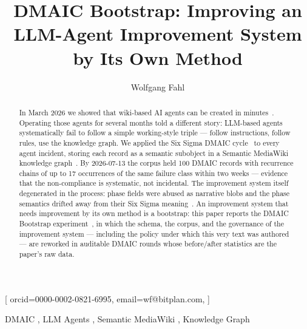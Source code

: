 \documentclass[
]{ceurart}
\begin{document}


\title{DMAIC Bootstrap: Improving an LLM-Agent Improvement System by Its Own Method}

\author[1]{Wolfgang Fahl}[%
orcid=0000-0002-0821-6995,
email=wf@bitplan.com,
]
\cormark[1]
\address[1]{BITPlan GmbH, Willich, Germany}


\begin{abstract}
In March 2026 we showed that wiki-based AI agents can be created in
minutes~\cite{fahl2026sixagents}. Operating those agents for several months
told a different story: LLM-based agents systematically fail to follow a
simple working-style triple --- follow instructions, follow rules, use the
knowledge graph. We applied the Six Sigma DMAIC
cycle~\cite{demast2012dmaic} to every agent incident, storing each record
as a semantic subobject in a Semantic MediaWiki~\cite{kroetzsch2006smw}
knowledge graph~\cite{agentteamcontext}. By 2026-07-13 the corpus held 100
DMAIC records with recurrence chains of up to 17 occurrences of the same
failure class within two weeks --- evidence that the non-compliance is
systematic, not incidental. The improvement system itself degenerated in
the process: phase fields were abused as narrative blobs and the phase
semantics drifted away from their Six Sigma
meaning~\cite{deming1986,demast2012dmaic}. An improvement system that needs
improvement by its own method is a bootstrap: this paper reports the DMAIC
Bootstrap experiment~\cite{dmaicbootstrap}, in which the schema, the
corpus, and the governance of the improvement system --- including the
policy under which this very text was authored --- are reworked in
auditable DMAIC rounds whose before/after statistics are the paper's raw
data.
\end{abstract}

\begin{keywords}
  DMAIC \sep
  LLM Agents \sep
  Semantic MediaWiki \sep
  Knowledge Graph
\end{keywords}
\end{document}
